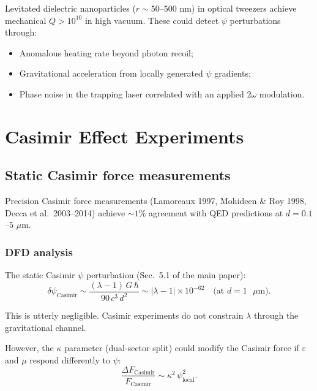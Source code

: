 \documentclass[12pt,letterpaper]{article}
\begin{document}
Levitated dielectric nanoparticles ($r \sim 50$--$500$ nm) in optical
tweezers achieve mechanical $Q > 10^{10}$ in high vacuum.  These could
detect $\psi$ perturbations through:
\begin{itemize}[noitemsep]
  \item Anomalous heating rate beyond photon recoil;
  \item Gravitational acceleration from locally generated $\psi$
    gradients;
  \item Phase noise in the trapping laser correlated with an applied
    $2\omega$ modulation.
\end{itemize}

\section{Casimir Effect Experiments}

\subsection{Static Casimir force measurements}

Precision Casimir force measurements (Lamoreaux 1997, Mohideen \&
Roy 1998, Decca et al.\ 2003--2014) achieve $\sim 1\%$ agreement with
QED predictions at $d = 0.1$--$5$ $\mu$m.

\subsubsection{DFD analysis}

The static Casimir $\psi$ perturbation (Sec.~5.1 of the main paper):
\begin{equation}
  \delta\psi_{\text{Casimir}} \sim
    \frac{(\lambda - 1)\,G\,\hbar}{90\,c^3\,d^2}
  \sim |\lambda - 1| \times 10^{-62}
  \quad\text{(at $d = 1$ $\mu$m)}.
\end{equation}

This is utterly negligible.  Casimir experiments do not constrain
$\lambda$ through the gravitational channel.

However, the $\kappa$ parameter (dual-sector split) could modify the
Casimir force if $\varepsilon$ and $\mu$ respond differently to $\psi$:
\begin{equation}
  \frac{\Delta F_{\text{Casimir}}}{F_{\text{Casimir}}}
  \sim \kappa^2\,\psi_{\text{local}}^2.
\end{equation}
\end{document}
